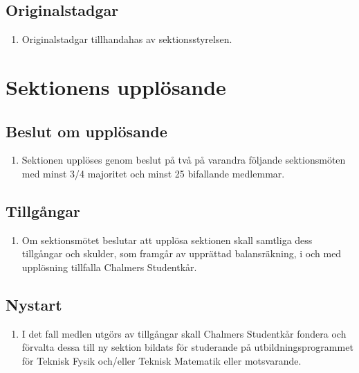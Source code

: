 \documentclass[11pt,a4paper]{article}
\begin{document}
\subsection{Originalstadgar}
\begin{enumerate}[\thesubsection.1]

  \item Originalstadgar tillhandahas av sektionsstyrelsen.

\end{enumerate}



\section{Sektionens upplösande}

\subsection{Beslut om upplösande}
\begin{enumerate}[\thesubsection.1]

  \item Sektionen upplöses genom beslut på två på varandra följande
  sektionsmöten med minst 3/4 majoritet och minst 25 bifallande
  medlemmar.

\end{enumerate}

\subsection{Tillgångar}
\begin{enumerate}[\thesubsection.1]

  \item Om sektionsmötet beslutar att upplösa sektionen skall samtliga
  dess tillgångar och skulder, som framgår av upprättad balansräkning,
  i och med upplösning tillfalla Chalmers Studentkår.

\end{enumerate}

\subsection{Nystart}
\begin{enumerate}[\thesubsection.1]

  \item I det fall medlen utgörs av tillgångar skall Chalmers Studentkår fondera och förvalta dessa till ny sektion bildats för studerande på utbildningsprogrammet för Teknisk Fysik och/eller Teknisk Matematik eller motsvarande.

\end{enumerate}
\end{document}
